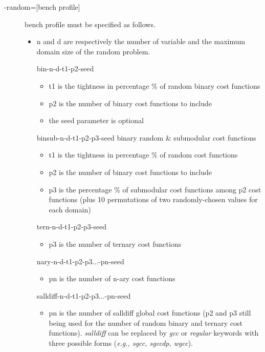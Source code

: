 \documentclass{article}
\begin{document}
\begin{description}
\item[{-random=[bench profile]}]
  bench profile must be specified as follows.
  \begin{itemize}
  \item n and d are respectively the number of variable and the
    maximum domain size of the random problem.
			
    bin-{n}-{d}-{t1}-{p2}-{seed}
    \begin{itemize}
    \item t1 is the tightness in percentage \% of random binary cost functions
    \item p2 is the number of binary cost functions to include
    \item the seed parameter is optional
    \end{itemize}   

    binsub-{n}-{d}-{t1}-{p2}-{p3}-{seed} binary random \& submodular cost functions       
    \begin{itemize}
      \item t1 is the tightness in percentage \% of random cost functions
      \item  p2 is the number of binary cost functions to include
      \item p3 is the percentage \% of submodular cost functions among p2 cost functions
        (plus 10 permutations of two randomly-chosen values for each domain)
      \end{itemize}
                                                                                   
       tern-{n}-{d}-{t1}-{p2}-{p3}-{seed} 
       \begin{itemize}
       \item p3 is the number of ternary cost functions
       \end{itemize}
       

      nary-{n}-{d}-{t1}-{p2}-{p3}...-{pn}-{seed}
       \begin{itemize}
       \item pn is the number of n-ary cost functions
       \end{itemize}

       salldiff-{n}-{d}-{t1}-{p2}-{p3}...-{pn}-{seed}  
       \begin{itemize}
       \item pn is the number of salldiff global cost functions (p2 and
         p3 still being used for the number of random binary and
         ternary cost functions). {\em salldiff} can be replaced by {\em gcc} or {\em regular} keywords with three possible forms ({\em e.g., sgcc, sgccdp, wgcc}).
       \end{itemize}
     \end{itemize}
   \end{description}
    
\end{document}
